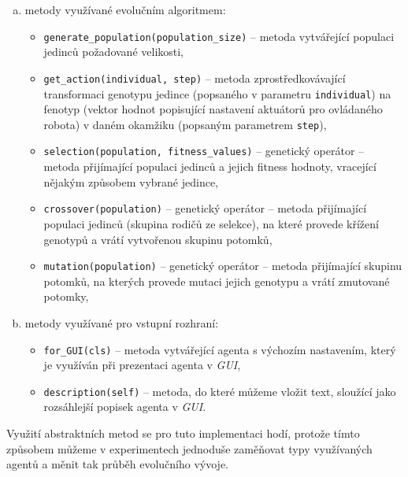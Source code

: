 \begin{enumerate}[a)]
    \item metody využívané evolučním algoritmem:
        \begin{itemize}
            \item \texttt{generate\_population(population\_size)} -- metoda
                vytvářející populaci jedinců požadované velikosti,
            \item \texttt{get\_action(individual, step)} -- metoda
                zprostředkovávající transformaci genotypu jedince (popsaného v
                parametru \texttt{individual}) na fenotyp (vektor hodnot
                popisující nastavení aktuátorů pro ovládaného robota) v daném
                okamžiku (popsaným parametrem \texttt{step}),
            \item \texttt{selection(population, fitness\_values)} -- genetický
                operátor -- metoda přijímající populaci jedinců a jejich
                fitness hodnoty, vracející nějakým způsobem vybrané jedince,
            \item \texttt{crossover(population)} -- genetický operátor --
                metoda přijímající populaci jedinců (skupina rodičů ze
                selekce), na které provede křížení genotypů a vrátí vytvořenou
                skupinu potomků,
            \item \texttt{mutation(population)} -- genetický operátor -- metoda
                přijímající skupinu potomků, na kterých provede mutaci jejich
                genotypu a vrátí zmutované potomky,
        \end{itemize}
    \item metody využívané pro vstupní rozhraní:
        \begin{itemize}
            \item \texttt{for\_GUI(cls)} -- metoda vytvářející agenta s
                výchozím nastavením, který je využíván při prezentaci agenta v
                \emph{GUI},
            \item \texttt{description(self)} -- metoda, do které můžeme vložit
                text, sloužící jako rozsáhlejší popisek agenta v \emph{GUI}.
        \end{itemize}
\end{enumerate}

Využití abstraktních metod se pro tuto implementaci hodí, protože tímto
způsobem můžeme v experimentech jednoduše zaměňovat typy využívaných
agentů a měnit tak průběh evolučního vývoje. 

